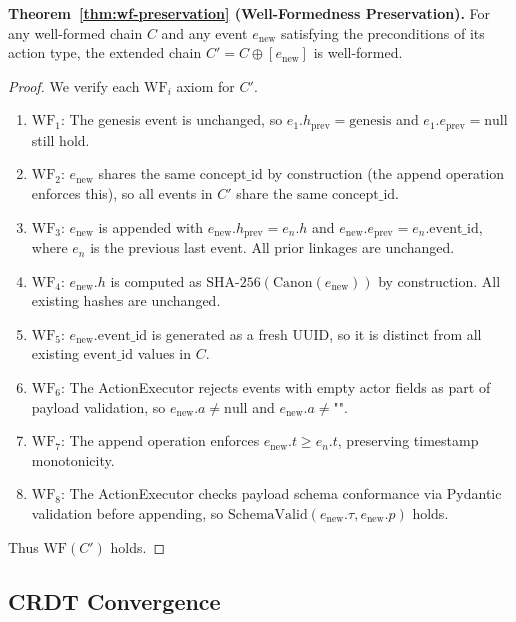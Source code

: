 \textbf{Theorem~\ref{thm:wf-preservation} (Well-Formedness Preservation).} For any well-formed chain $C$ and any event $e_{\text{new}}$ satisfying the preconditions of its action type, the extended chain $C' = C \oplus [e_{\text{new}}]$ is well-formed.
\begin{proof}
We verify each $\text{WF}_i$ axiom for $C'$.
\begin{enumerate}[label=(\arabic*)]
    \item $\text{WF}_1$: The genesis event is unchanged, so $e_1.h_{\text{prev}} = \text{genesis}$ and $e_1.e_{\text{prev}} = \text{null}$ still hold.
    \item $\text{WF}_2$: $e_{\text{new}}$ shares the same $\text{concept\_id}$ by construction (the append operation enforces this), so all events in $C'$ share the same $\text{concept\_id}$.
    \item $\text{WF}_3$: $e_{\text{new}}$ is appended with $e_{\text{new}}.h_{\text{prev}} = e_n.h$ and $e_{\text{new}}.e_{\text{prev}} = e_n.\text{event\_id}$, where $e_n$ is the previous last event. All prior linkages are unchanged.
    \item $\text{WF}_4$: $e_{\text{new}}.h$ is computed as $\text{SHA-256}(\text{Canon}(e_{\text{new}}))$ by construction. All existing hashes are unchanged.
    \item $\text{WF}_5$: $e_{\text{new}}.\text{event\_id}$ is generated as a fresh UUID, so it is distinct from all existing $\text{event\_id}$ values in $C$.
    \item $\text{WF}_6$: The ActionExecutor rejects events with empty actor fields as part of payload validation, so $e_{\text{new}}.a \neq \text{null}$ and $e_{\text{new}}.a \neq \text{""}$.
    \item $\text{WF}_7$: The append operation enforces $e_{\text{new}}.t \geq e_n.t$, preserving timestamp monotonicity.
    \item $\text{WF}_8$: The ActionExecutor checks payload schema conformance via Pydantic validation before appending, so $\text{SchemaValid}(e_{\text{new}}.\tau, e_{\text{new}}.p)$ holds.
\end{enumerate}
Thus $\text{WF}(C')$ holds.
\end{proof}

\subsection{CRDT Convergence}

